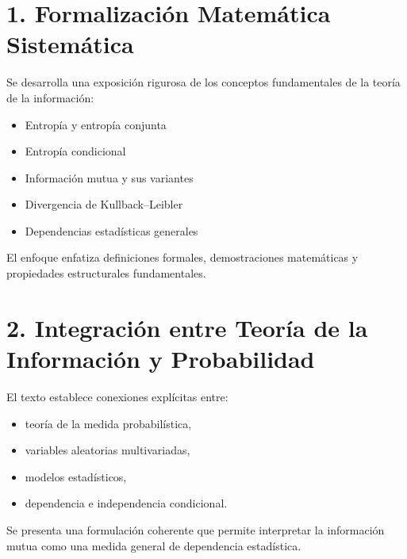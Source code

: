 \documentclass[letterpaper,10pt,english]{jupyterBook}
\begin{document}
\section{1. Formalización Matemática Sistemática}
\label{\detokenize{00_frontmatter/contributions:formalizacion-matematica-sistematica}}
\sphinxAtStartPar
Se desarrolla una exposición rigurosa de los conceptos fundamentales de la teoría de la información:
\begin{itemize}
\item {} 
\sphinxAtStartPar
Entropía y entropía conjunta

\item {} 
\sphinxAtStartPar
Entropía condicional

\item {} 
\sphinxAtStartPar
Información mutua y sus variantes

\item {} 
\sphinxAtStartPar
Divergencia de Kullback–Leibler

\item {} 
\sphinxAtStartPar
Dependencias estadísticas generales

\end{itemize}

\sphinxAtStartPar
El enfoque enfatiza definiciones formales, demostraciones matemáticas y propiedades estructurales fundamentales.


\section{2. Integración entre Teoría de la Información y Probabilidad}
\label{\detokenize{00_frontmatter/contributions:integracion-entre-teoria-de-la-informacion-y-probabilidad}}
\sphinxAtStartPar
El texto establece conexiones explícitas entre:
\begin{itemize}
\item {} 
\sphinxAtStartPar
teoría de la medida probabilística,

\item {} 
\sphinxAtStartPar
variables aleatorias multivariadas,

\item {} 
\sphinxAtStartPar
modelos estadísticos,

\item {} 
\sphinxAtStartPar
dependencia e independencia condicional.

\end{itemize}

\sphinxAtStartPar
Se presenta una formulación coherente que permite interpretar la información mutua como una medida general de dependencia estadística.
\end{document}
